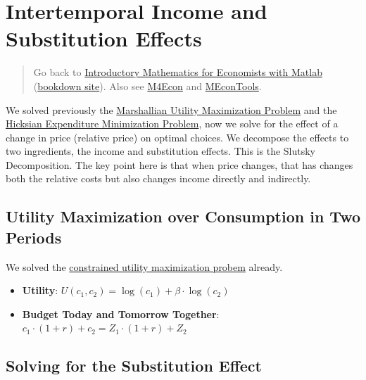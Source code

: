 \documentclass[
]{book}
\begin{document}
\hypertarget{intertemporal-income-and-substitution-effects}{%
\section{Intertemporal Income and Substitution Effects}\label{intertemporal-income-and-substitution-effects}}

\begin{quote}
Go back to \href{https://math4econ.github.io/}{Introductory Mathematics for Economists with Matlab} (\href{https://math4econ.github.io/bookdown}{bookdown site}). Also see \href{http://fanwangecon.github.io/M4Econ}{M4Econ} and \href{https://fanwangecon.github.io/MEconTools/}{MEconTools}.
\end{quote}

We solved previously the \href{https://math4econ.github.io/opti_hh_constrained_brsv/household_c1_c2_constrained.html}{Marshallian Utility Maximization
Problem}
and the \href{https://math4econ.github.io/opti_hh_constrained_brsv/household_c1_c2_constrained_expmin.html}{Hicksian Expenditure Minimization
Problem},
now we solve for the effect of a change in price (relative price) on
optimal choices. We decompose the effects to two ingredients, the income
and substitution effects. This is the Slutsky Decomposition. The key
point here is that when price changes, that has changes both the
relative costs but also changes income directly and indirectly.

\hypertarget{utility-maximization-over-consumption-in-two-periods-2}{%
\subsection{Utility Maximization over Consumption in Two Periods}\label{utility-maximization-over-consumption-in-two-periods-2}}

We solved the \href{https://math4econ.github.io/opti_hh_constrained_brsv/household_c1_c2_constrained.html}{constrained utility maximization
probem}
already.

\begin{itemize}
\item
  \textbf{Utility}: \(U(c_1 ,c_2 )=\log (c_1 )+\beta \cdot \log (c_2 )\)
\item
  \textbf{Budget Today and Tomorrow Together}:
  \(c_1 \cdot (1+r)+c_2 =Z_1 \cdot (1+r)+Z_2\)
\end{itemize}

\hypertarget{solving-for-the-substitution-effect}{%
\subsection{Solving for the Substitution Effect}\label{solving-for-the-substitution-effect}}
\end{document}
